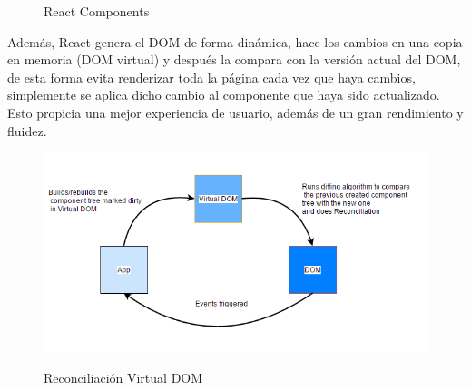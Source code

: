 \documentclass[12pt,twoside,titlepage]{report}
\begin{document}
\begin{figure}[H]
    \centering
    \caption{React Components}
    \label{f:ReactComponents}
   \end{figure}

Además, React genera el DOM de forma dinámica, hace los cambios en una copia en memoria (DOM virtual) y después la compara con la versión actual del DOM, de esta forma evita renderizar toda la página cada vez que haya cambios, simplemente se aplica dicho cambio al componente que haya sido actualizado. Esto propicia una mejor experiencia de usuario, además de un gran rendimiento y fluidez.

\begin{figure}[H]
    \centering
    \includegraphics[scale=0.5]{React_VirtualDom}
    \label{fig:React_VirtualDom}
    \caption{Reconciliación Virtual DOM}
\end{figure}
\end{document}

